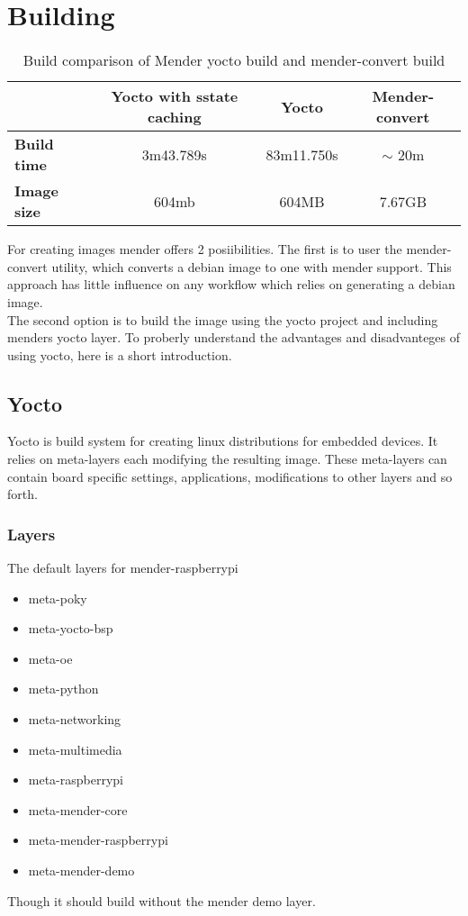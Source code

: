 \documentclass[../../main.tex]{subfiles}
\begin{document}
\section{Building}%
\label{sec:building}

\begin{table}[h]
	\centering
	\caption{Build comparison of Mender yocto build and mender-convert build}
	\label{tab:build_comp}
	\begin{tabular}{l|ccc}
		& \textbf{Yocto with sstate caching}& \textbf{Yocto} & \textbf{Mender-convert}\\
		\hline
		\textbf{Build time}&3m43.789s&83m11.750s& $\sim$ 20m \\
		\textbf{Image size}&604mb&604MB&7.67GB\\
	\end{tabular}
\end{table}


For creating images mender offers 2 posiibilities.
The first is to user the mender-convert utility, which converts a debian image
to one with mender support. This approach has little influence on any workflow which relies
on generating a debian image.\\
The second option is to build the image using the yocto project and including menders yocto layer.
To proberly understand the advantages and disadvanteges of using yocto, here is a short introduction.

\subsection{Yocto}%
\label{sub:yocto}

Yocto is build system for creating linux distributions for embedded devices. It relies on meta-layers
each modifying the resulting image. These meta-layers can contain board specific settings,
applications, modifications to other layers and so forth.



\subsubsection{Layers}%
\label{ssub:layers}

The default layers for mender-raspberrypi
\begin{itemize}
	\item meta-poky
	\item meta-yocto-bsp
	\item meta-oe
	\item meta-python
	\item meta-networking
	\item meta-multimedia
	\item meta-raspberrypi
	\item meta-mender-core
	\item meta-mender-raspberrypi
	\item meta-mender-demo
\end{itemize}
Though it should build without the mender demo layer.


\end{document}
